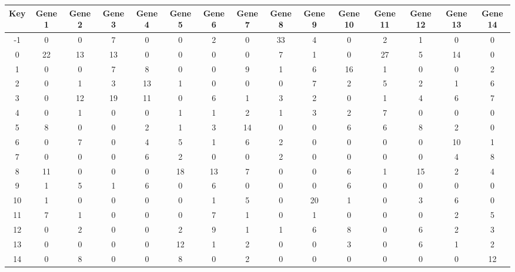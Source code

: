 \begin{tabular}{|c|c|c|c|c|c|c|c|c|c|c|c|c|c|c|}
\hline
Key & Gene 1 & Gene 2 & Gene 3 & Gene 4 & Gene 5 & Gene 6 & Gene 7 & Gene 8 & Gene 9 & Gene 10 & Gene 11 & Gene 12 & Gene 13 & Gene 14 \\
\hline
-1 & 0 & 0 & 7 & 0 & 0 & 2 & 0 & 33 & 4 & 0 & 2 & 1 & 0 & 0 \\
0 & 22 & 13 & 13 & 0 & 0 & 0 & 0 & 7 & 1 & 0 & 27 & 5 & 14 & 0 \\
1 & 0 & 0 & 7 & 8 & 0 & 0 & 9 & 1 & 6 & 16 & 1 & 0 & 0 & 2 \\
2 & 0 & 1 & 3 & 13 & 1 & 0 & 0 & 0 & 7 & 2 & 5 & 2 & 1 & 6 \\
3 & 0 & 12 & 19 & 11 & 0 & 6 & 1 & 3 & 2 & 0 & 1 & 4 & 6 & 7 \\
4 & 0 & 1 & 0 & 0 & 1 & 1 & 2 & 1 & 3 & 2 & 7 & 0 & 0 & 0 \\
5 & 8 & 0 & 0 & 2 & 1 & 3 & 14 & 0 & 0 & 6 & 6 & 8 & 2 & 0 \\
6 & 0 & 7 & 0 & 4 & 5 & 1 & 6 & 2 & 0 & 0 & 0 & 0 & 10 & 1 \\
7 & 0 & 0 & 0 & 6 & 2 & 0 & 0 & 2 & 0 & 0 & 0 & 0 & 4 & 8 \\
8 & 11 & 0 & 0 & 0 & 18 & 13 & 7 & 0 & 0 & 6 & 1 & 15 & 2 & 4 \\
9 & 1 & 5 & 1 & 6 & 0 & 6 & 0 & 0 & 0 & 6 & 0 & 0 & 0 & 0 \\
10 & 1 & 0 & 0 & 0 & 0 & 1 & 5 & 0 & 20 & 1 & 0 & 3 & 6 & 0 \\
11 & 7 & 1 & 0 & 0 & 0 & 7 & 1 & 0 & 1 & 0 & 0 & 0 & 2 & 5 \\
12 & 0 & 2 & 0 & 0 & 2 & 9 & 1 & 1 & 6 & 8 & 0 & 6 & 2 & 3 \\
13 & 0 & 0 & 0 & 0 & 12 & 1 & 2 & 0 & 0 & 3 & 0 & 6 & 1 & 2 \\
14 & 0 & 8 & 0 & 0 & 8 & 0 & 2 & 0 & 0 & 0 & 0 & 0 & 0 & 12 \\
\hline
\end{tabular}